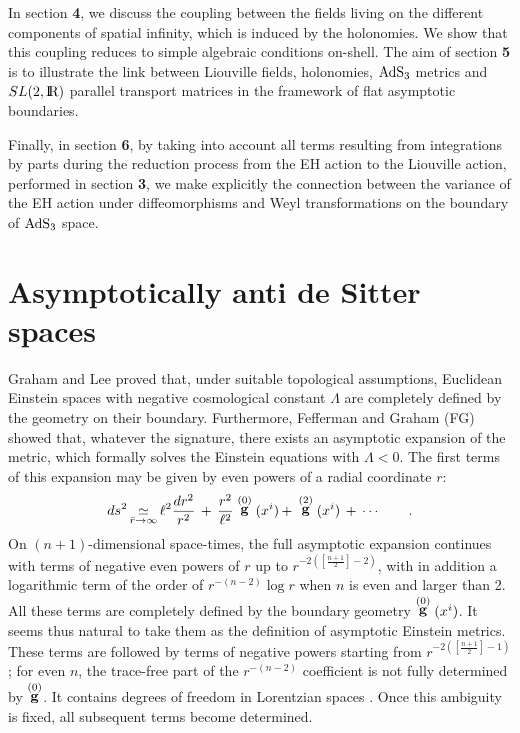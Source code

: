 \documentclass[a4paper,10pt]{article}
\begin{document}
In section {\bf 4}, we discuss the coupling between the fields living on the
different components of spatial infinity, which is induced by
the holonomies. We show that this coupling 
reduces to simple algebraic conditions
on-shell. The aim of section {\bf 5} is to illustrate the link between 
Liouville fields, holonomies, $\rm AdS_3$ metrics and $SL(2,{\hbox{{\rm I}\kern-.2em\hbox{\rm R}}})$ parallel
transport matrices in the framework of flat asymptotic boundaries.
 
Finally, in section {\bf 6}, by taking into account all  
terms resulting from integrations by parts during the reduction process from 
the EH action to the Liouville action, performed in section {\bf 3}, we make 
explicitly the  
connection between the variance of the EH action under diffeomorphisms 
and Weyl transformations on the boundary of  $\rm AdS_3$ space. 
 
\section{Asymptotically anti de Sitter spaces} 
 
Graham and Lee \cite{GL} proved that, under suitable topological 
assumptions, Euclidean 
Einstein spaces with negative cosmological constant $\Lambda$ 
are completely defined by the geometry on 
their boundary. Furthermore, Fefferman and Graham (FG) \cite{FG}  
showed that, whatever the signature, 
there exists an asymptotic expansion of the metric, which formally  
solves the Einstein equations with $\Lambda<0$. 
The first terms of this expansion may be given by even powers of  
a radial coordinate $r$: 
\begin{equation} 
\label{FG} 
ds^2  
\mathop {\simeq} \limits_{\bar r \rightarrow \infty} 
 \ell^2 {dr^2\over{r^2}} \, + \, 
\frac {r^2} {\ell^2} \stackrel {(0)} {\bf g} (x^i)  \, + \, 
\stackrel {(2)} {\bf g} (x^i) \, + \, \cdots \qquad . 
\end{equation} 
On $(n+1)$-dimensional space-times, the full asymptotic expansion 
continues with terms of negative even  powers of $r$ up 
to $r^{-2([\frac {n+1} 2]-2)}$, with in addition a logarithmic term of  
the order 
of $r^{-(n-2)}\log r$ when $n$ is even and larger than 2. All these terms 
are completely defined by the boundary geometry  
$\stackrel {(0)} {\bf g} (x^i)$. It seems thus natural 
to take them as the definition of asymptotic Einstein metrics. 
These terms are 
followed by terms of negative powers 
starting from $r^{-2([\frac {n+1} 2]-1)}$; for even $n$, 
the trace-free part of the $r^{-(n-2)}$ 
coefficient is not fully determined by $\stackrel {(0)} {\bf g}$. It 
contains degrees of freedom in Lorentzian spaces \cite{NB,BERS}.  
Once this ambiguity is fixed,  
all subsequent terms become determined. 
 
\end{document}
